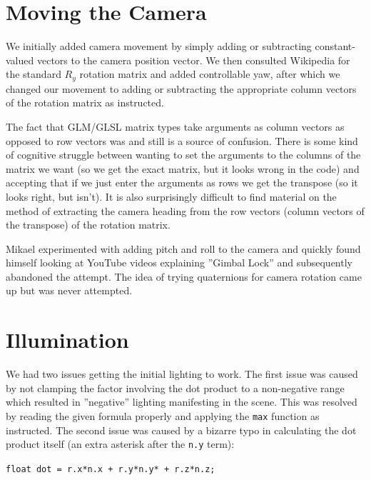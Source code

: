 \documentclass[a4paper,11pt]{article}
\begin{document}
\section*{Moving the Camera}
We initially added camera movement by simply adding or subtracting constant-valued vectors
to the camera position vector. We then consulted Wikipedia for the standard $R_y$ rotation
matrix and added controllable yaw, after which we changed our movement to adding or
subtracting the appropriate column vectors of the rotation matrix as instructed.

The fact that GLM/GLSL matrix types take arguments as column vectors as opposed to row vectors
was and still is a source of confusion. There is some kind of cognitive struggle between wanting to
set the arguments to the columns of the matrix we want (so we get the exact matrix, but it looks
wrong in the code) and accepting that if we just enter the arguments as rows we get the transpose (so
it looks right, but isn't). It is also surprisingly difficult to find material on the method of
extracting the camera heading from the row vectors (column vectors of the transpose) of the rotation matrix.

Mikael experimented with adding pitch and roll to the camera and quickly found himself looking
at YouTube videos explaining ''Gimbal Lock'' and subsequently abandoned the attempt. The idea of
trying quaternions for camera rotation came up but was never attempted.

\section*{Illumination}

We had two issues getting the initial lighting to work. The first issue
was caused by not clamping the factor involving the dot product to
a non-negative range which resulted in ''negative'' lighting manifesting
in the scene. This was resolved by reading the given formula properly
and applying the \texttt{max} function as instructed. The second issue was
caused by a bizarre typo in calculating the dot product itself (an extra
asterisk after the \texttt{n.y} term):

\begin{center}
\texttt{float dot = r.x*n.x + r.y*n.y* + r.z*n.z;}
\end{center}
\end{document}
